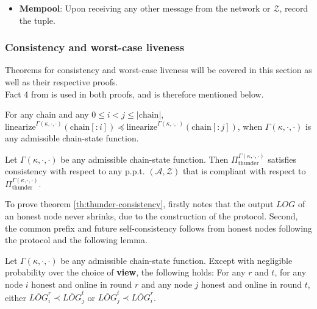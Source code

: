 \begin{itemize}
    \item \textbf{Mempool}: Upon receiving any other message from the network or $\mathcal{Z}$, record the tuple.
\end{itemize}


\subsubsection*{Consistency and worst-case liveness}

Theorems for consistency and worst-case liveness will be covered in this section as well as their respective proofs.\\

Fact 4 from \cite{thunderella} is used in both proofs, and is therefore mentioned below.
\begin{fact}
For any chain and any $0 \leq i < j \leq |\text{chain}|$, $\text{linearize}^{\Gamma(\kappa,\cdot,\cdot)}(\text{chain}[:i]) \preceq \text{linearize}^{\Gamma(\kappa,\cdot,\cdot)}(\text{chain}[:j])$, when $\Gamma(\kappa,\cdot,\cdot)$ is any admissible chain-state function.
\end{fact}


\begin{theorem}[Consistency]
\label{th:thunder-consistency}
Let $\Gamma(\kappa, \cdot, \cdot)$ be any admissible chain-state function. Then $\Pi_{\text{thunder}}^{\Gamma(\kappa, \cdot, \cdot)}$ satisfies consistency with respect to any p.p.t. $(\mathcal{A}, \mathcal{Z})$ that is compliant with respect to $\Pi_{\text{thunder}}^{\Gamma(\kappa, \cdot, \cdot)}$.
\end{theorem}

To prove theorem \ref{th:thunder-consistency}, \cite{thunderella} firstly notes that the output $LOG$ of an honest node never shrinks, due to the construction of the protocol. Second, the common prefix and future self-consistency follows from honest nodes following the protocol and the following lemma.

\begin{lemma}
Let $\Gamma(\kappa, \cdot, \cdot)$ be any admissible chain-state function. Except with negligible probability over the choice of \textbf{view}, the following holds: For any $r$ and $t$, for any node $i$ honest and online in round $r$ and any node $j$ honest and online in round $t$, either $\overline{LOG}_i^r \prec \overline{LOG}_j^t$ or $\overline{LOG}_j^t \prec \overline{LOG}_i^r$.
\end{lemma}

